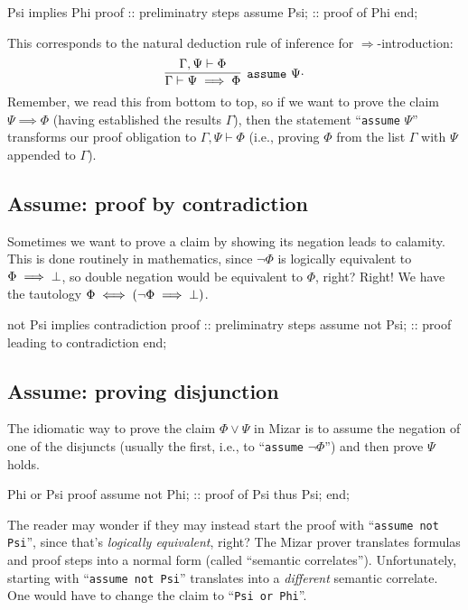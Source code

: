 \begin{mizar}
Psi implies Phi
proof
  :: preliminatry steps
  assume Psi;
  :: proof of Phi
end;
\end{mizar}

This corresponds to the natural deduction rule of inference for
$\Longrightarrow$-introduction:
\begin{equation}
  \vcenter{\infer[\mathtt{assume}~\Psi]{\Gamma\vdash\Psi\implies\Phi}{\Gamma,\Psi\vdash\Phi}}.
\end{equation}
Remember, we read this from bottom to top, so if we want to prove
the claim $\Psi\implies\Phi$ (having established the results $\Gamma$),
then the statement ``\verb#assume# $\Psi$'' transforms our proof
obligation to $\Gamma,\Psi\vdash\Phi$ (i.e., proving $\Phi$ from the
list $\Gamma$ with $\Psi$ appended to $\Gamma$).

\subsection{Assume: proof by contradiction}
Sometimes we want to prove a claim by showing its negation leads to
calamity. This is done routinely in mathematics, since $\neg\Phi$ is
logically equivalent to $\Phi\implies\bot$, so double negation
would be equivalent to $\Phi$, right? Right! We have the tautology
$\Phi\iff(\neg\Phi\implies\bot)$.

\begin{mizar}
not Psi implies contradiction
proof
  :: preliminatry steps
  assume not Psi;
  :: proof leading to contradiction
end;
\end{mizar}

\subsection{Assume: proving disjunction}
The idiomatic way to prove the claim $\Phi\lor\Psi$ in Mizar is to
assume the negation of one of the disjuncts (usually the first, i.e.,
to ``\verb#assume# $\neg\Phi$'') and then prove $\Psi$ holds.
\begin{mizar}
Phi or Psi
proof
  assume not Phi;
  :: proof of Psi
  thus Psi;
end;
\end{mizar}

\begin{ddanger}
  The reader may wonder if they may instead start the proof with
  ``\verb#assume not Psi#'', since that's \emph{logically equivalent}, right?
  The Mizar prover translates formulas and proof steps into a normal
  form (called ``semantic correlates'').
  Unfortunately, starting with ``\verb#assume not Psi#'' translates into
  a \emph{different} semantic correlate. One would have to change the
  claim to ``\verb#Psi or Phi#''.
\end{ddanger}


